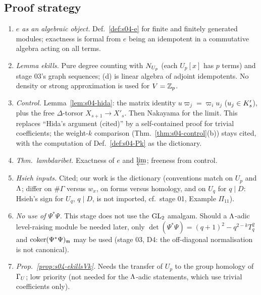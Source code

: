 \subsection{Proof strategy}
\begin{enumerate}
\item \emph{$e$ as an algebraic object.} Def.~\ref{def:s04-e} for finite and finitely generated modules; exactness is formal from
  $e$ being an idempotent in a commutative algebra acting on all terms.
\item \emph{Lemma ekills.} Pure degree counting with $N_{U_p}$ (each $U_p[x]$ has $p$ terms) and stage 03's graph sequences; (d) is
  linear algebra of adjoint idempotents. No density or strong approximation is used for $V=\mathbb{Z}_p$.
\item \emph{Control.} Lemma~\ref{lem:s04-hida}: the matrix identity $u\varpi_j=\varpi_iu_j$ ($u_j\in K'_{s}$), plus the free
  $\Delta$-torsor $X_{s+1}\to X'_s$. Then Nakayama for the limit. This replaces ``Hida's argument (cited)'' by a self-contained proof
  for trivial coefficients; the weight-$k$ comparison (Thm.~\ref{thm:s04-control}(b)) stays cited, with the computation of
  Def.~\ref{def:s04-Pk} as the dictionary.
\item \emph{Thm.~lambdaribet.} Exactness of $e$ and $\varprojlim$; freeness from control.
\item \emph{Hsieh inputs.} Cited; our work is the dictionary (conventions match on $U_p$ and $\Lambda$; differ on $\#\Gamma$ versus $w_x$,
  on forms versus homology, and on $U_q$ for $q\mid D$: Hsieh's sign for $U_q$, $q\mid D$, is not imported, cf.\ stage 01, Example $\Pi_{11}$).
\item \emph{No use of $\Psi^*\Psi$.} This stage does not use the $\mathrm{GL}_2$ amalgam. Should a $\Lambda$-adic level-raising module be
  needed later, only $\det(\Psi^*\Psi)=(q+1)^2-q^{2-k}T_q^2$ and $\operatorname{coker}(\Psi^*\Psi)_{\mathfrak{m}}$ may be used (stage 03, D4: the
  off-diagonal normalisation is not canonical).
\item \emph{Prop.~\ref{prop:s04-ekillsVk}.} Needs the transfer of $U_p$ to the group homology of $\Gamma_U$; low priority (not needed for
  the $\Lambda$-adic statements, which use trivial coefficients only).
\end{enumerate}

